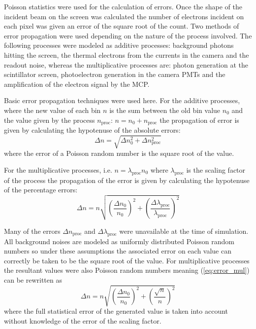 Poisson statistics were used for the calculation of errors.  Once the shape of
the incident beam on the screen was calculated the number of electrons incident
on each pixel was given an error of the square root of the count. Two methods of
error propagation were used depending on the nature of the process involved.
The following processes were modeled as additive processes: background photons
hitting the screen, the thermal electrons from the currents in the camera and
the readout noise, whereas the multiplicative processes are: photon generation
at the scintillator screen, photoelectron generation in the camera PMTs and the
amplification of the electron signal by the MCP.

Basic error propagation techniques were used here. For the additive processes,
where the new value of each bin $n$ is the sum between the old bin value $n_0$
and the value given by the process $n_\text{proc}$: $n=n_0+n_\text{proc}$ the
propagation of error is given by calculating the hypotenuse of the absolute
errors:
\begin{equation}
	\Delta n= \sqrt{\Delta n_0^2 + \Delta n_\text{proc}^2}
\end{equation}
where the error of a Poisson random number is the square root of the value.

For the multiplicative processes, i.e. $n = \lambda_\text{proc}n_0 $ where
$\lambda_\text{proc}$ is the scaling factor of the process the propagation of
the error is given by calculating the hypotenuse of the percentage errors:
\begin{equation}
	\Delta n= n \sqrt{
		\left( \frac{\Delta n_0}{n_0} \right)^2 +
		\left( \frac{\Delta \lambda_\text{proc}}{\lambda_\text{proc}} \right)^2}
	\label{eq:error_mul}
\end{equation}


Many of the errors \(\Delta n_\text{proc}\) and \(\Delta \lambda_\text{proc}\)
were unavailable at the time of simulation. All background noises are modeled as
uniformly distributed Poisson random numbers so under these assumptions the
associated error on each value can correctly be taken to be the square root of
the value. %
For multiplicative processes the resultant values were also Poisson random
numbers meaning (\ref{eq:error_mul}) can be rewritten as
\begin{equation}
	\Delta n= n \sqrt{
		\left( \frac{\Delta n_0}{n_0} \right)^2 +
	\left( \frac{\sqrt{n}}{n} \right)^2}
\end{equation}
where the full statistical error of the generated value is taken into account
without knowledge of the error of the scaling factor.

